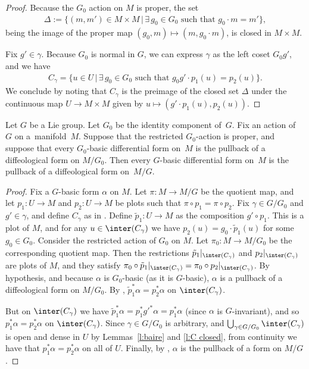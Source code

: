 \begin{proof}
Because the $G_0$ action on $M$ is proper, the set
\begin{gather*}
\Delta := \{ (m,m') \in M \times M \, | \,
\exists\, g_0 \in G_0 \text{ such that } g_0 \cdot m = m' \},
\end{gather*}
being the image of the proper map $(g_0,m) \mapsto (m,g_0 \cdot m)$,
is closed in $M \times M$.

Fix $g' \in \gamma$. Because $G_0$ is normal in $G$,
we can express $\gamma$ as the left coset $G_0 g'$, and we have
\begin{gather*} C_\gamma = \{ u \in U \, | \, \exists\, g_0 \in G_0 \text{ such that }
g_0 g' \cdot p_1(u) = p_2(u) \} .\end{gather*}
We conclude by noting that $C_\gamma$ is the preimage of the closed set $\Delta$
under the continuous map $U \to M \times M$
given by $u \mapsto ( g' \cdot p_1(u) , p_2(u) )$.
\end{proof}

\begin{Lemma} \label{l:conntodisc}
Let $G$ be a Lie group. Let $G_0$ be the identity component of~$G$.
Fix an action of~$G$ on a~mani\-fold~$M$.
Suppose that the restricted $G_0$-action is proper,
and suppose that every $G_0$-basic differential form on~$M$
is the pullback of a diffeological form on $M/G_0$.
Then every $G$-basic differential form on~$M$
is the pullback of a diffeological form on~$M/G$.
\end{Lemma}

\begin{proof}
Fix a $G$-basic form $\alpha$ on $M$.
Let $\pi \colon M\to M/G$ be the quotient map,
and let $p_1 \colon U\to M$ and $p_2 \colon U\to M$ be plots
such that $\pi\circ p_1=\pi\circ p_2$.
Fix $\gamma\in G/G_0$ and
$g' \in \gamma$, and def\/ine $C_\gamma$
as in . Def\/ine $\tilde{p}_1 \colon U \to M$
as the composition
$g' \circ p_1$. This is a plot of $M$,
and for any $u \in \inter(C_\gamma)$ we have
$p_2(u) = g_0 \cdot\tilde{p}_1(u)$ for some $g_0 \in G_0$.
Consider the restricted action of $G_0$ on $M$.
Let $\pi_0 \colon M \to M/G_0$ be the corresponding quotient map.
Then the restrictions $\tilde{p}_1|_{\inter(C_\gamma)}$
and $p_2|_{\inter(C_\gamma)}$ are plots of $M$,
and they satisfy
$\pi_0 \circ \tilde{p}_1|_{\inter(C_\gamma)}
 = \pi_0 \circ p_2|_{\inter(C_\gamma)}$.
By hypothesis, and because $\alpha$ is $G_0$-basic (as it is $G$-basic),
$\alpha$ is a pullback of a dif\/feological form on $M/G_0$.
By ,
$\tilde{p}_1^* \alpha = p_2^*\alpha$ on $\inter(C_\gamma)$.

But on $\inter(C_\gamma)$ we have
$\tilde{p}_1^* \alpha = p_1^* {g'}^* \alpha = p_1^* \alpha$
(since $\alpha$ is $G$-invariant),
and so $p_1^* \alpha = p_2^* \alpha$ on $\inter(C_\gamma)$.
Since $\gamma\in G/G_0$ is arbitrary,
and $\bigcup_{\gamma\in G/G_0}\inter(C_\gamma)$ is open and dense in $U$
by Lemmas~\ref{l:baire} and \ref{l:C closed},
%
%
from continuity we have that $p_1^*\alpha=p_2^*\alpha$ on all of $U$.
Finally, by ,
$\alpha$ is the pullback of a form on $M/G$.
\end{proof}


